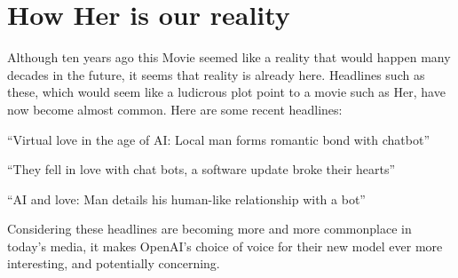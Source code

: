 \section{How Her is our reality}
\label{sec:ai}


   
Although ten years ago this Movie seemed like a reality that would happen many decades in the future, it seems that reality is already here. Headlines such as these, which would seem like a ludicrous plot point to a movie such as Her, have now become almost common. Here are some recent headlines: 
   
“Virtual love in the age of AI: Local man forms romantic bond with chatbot” 

   “They fell in love with chat bots, a software update broke their hearts”
   
   “AI and love: Man details his human-like relationship with a bot”
   
   Considering these headlines are becoming more and more commonplace in today's media, it makes OpenAI’s choice of voice for their new model ever more interesting, and potentially concerning. 
